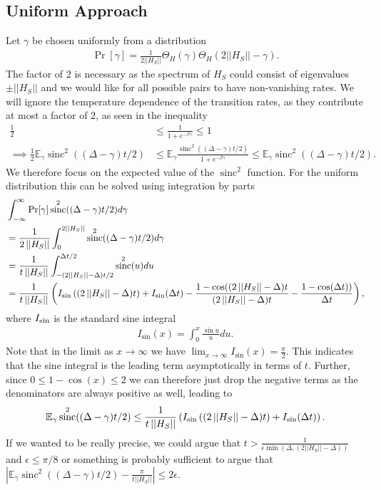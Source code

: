 \documentclass[
 amsmath,amssymb,
 aps,
onecolumn, 
nofootinbib]{revtex4-2}
\newcommand{\abs}[1]{\left| #1 \right|}
\newcommand{\norm}[1]{\left|\left| #1 \right|\right|}
\newcommand{\EE}{\mathbb{E}}
\DeclareMathOperator{\sinc}{sinc}
\begin{document}
\subsection{Uniform Approach}
Let $\gamma$ be chosen uniformly from a distribution
\begin{align}
    \Pr[\gamma] = \frac{1}{2\norm{H_S}} \Theta_H(\gamma) \Theta_H(2 \norm{H_S} - \gamma).
\end{align}
The factor of $2$ is necessary as the spectrum of $H_S$ could consist of eigenvalues $\pm \norm{H_S}$ and we would like for all possible pairs to have non-vanishing rates. We will ignore the temperature dependence of the transition rates, as they contribute at most a factor of $2$, as seen in the inequality
\begin{align}
    \frac{1}{2} &\le \frac{1}{1 + e^{-\beta \gamma}} \le 1 \\
    \implies \frac{1}{2}\EE_\gamma \sinc^2((\Delta - \gamma) t/ 2) &\le  \EE_\gamma \frac{\sinc^2((\Delta - \gamma) t/ 2)}{1 + e^{-\beta \gamma}} \le \EE_\gamma \sinc^2((\Delta - \gamma) t/ 2).
\end{align}
We therefore focus on the expected value of the $\sinc^2$ function. For the uniform distribution this can be solved using integration by parts
\begin{align}
&\int_{-\infty}^{\infty} \Pr[\gamma]\sinc^2((\Delta - \gamma) t/ 2) d\gamma \\
&= \frac{1}{2 \norm{H_S}} \int_0^{2 \norm{H_S}} \sinc^2 ((\Delta - \gamma) t /2) d \gamma \\
&= \frac{1}{t \norm{H_S}}  \int_{- (2 \norm{H_S} - \Delta) t /2}^{\Delta t /2} \sinc^2 (u) d u \\
&= \frac{1}{t \norm{H_S}} \left( I_{\sin}\left((2 \norm{H_S} - \Delta)t \right) + I_{\rm sin}(\Delta t) - \frac{1- \cos((2 \norm{H_S} - \Delta)t}{(2 \norm{H_S} - \Delta)t} - \frac{1- \cos(\Delta t))}{\Delta t} \right), 
\end{align}
where $I_{\rm sin}$ is the standard sine integral
\begin{align}
    I_{\sin}(x) = \int_{0}^{x} \frac{\sin u}{u} du.
\end{align}
Note that in the limit as $x \to \infty$ we have $\lim_{x \to \infty} I_{\sin}(x) = \frac{\pi}{2}$. This indicates that the sine integral is the leading term asymptotically in terms of $t$. Further, since $0 \le 1 - \cos(x) \le 2$ we can therefore just drop the negative terms as the denominators are always positive as well, leading to 
\begin{align}
    \EE_\gamma \sinc^2((\Delta - \gamma) t/ 2) \le \frac{1}{t \norm{H_S}} \left( I_{\sin}\left((2 \norm{H_S} - \Delta)t \right) + I_{\rm sin}(\Delta t) \right).
\end{align}
If we wanted to be really precise, we could argue that $t > \frac{1}{\epsilon \min(\Delta, (2 \norm{H_S} - \Delta)) }$ and $\epsilon \le \pi / 8$ or something is probably sufficient to argue that $\abs{\EE_\gamma \sinc^2((\Delta - \gamma) t /2) - \frac{\pi}{t \norm{H_S}}} \le 2 \epsilon$. 
\end{document}
